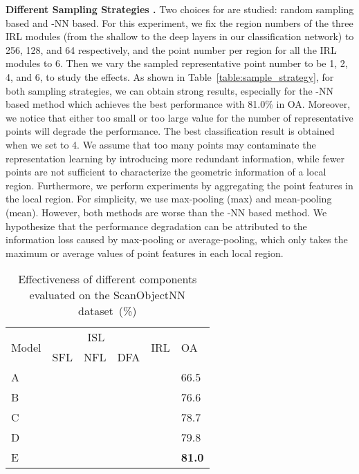 \documentclass[journal]{IEEEtran}
\begin{document}
\noindent\textbf{Different Sampling Strategies .} Two choices for  are studied: random sampling based and -NN based. For this experiment, we fix the region numbers of the three IRL modules (from the shallow to the deep layers in our classification network) to 256, 128, and 64 respectively, and the point number  per region for all the IRL modules to 6. Then we vary the sampled representative point number  to be 1, 2, 4, and 6, to study the effects.
As shown in Table~\ref{table:sample_strategy}, for both sampling strategies, we can obtain strong results, especially for the -NN based method which achieves the best performance with 81.0\% in OA. Moreover, we notice that either too small or too large value for the number of representative points  will degrade the performance. The best classification result is obtained when we set  to 4. We assume that too many points may contaminate the representation learning by introducing more redundant information, while fewer points are not sufficient to characterize the geometric information of a local region. 
Furthermore, we perform experiments by aggregating the point features in the local region. For simplicity, we use max-pooling (max) and mean-pooling (mean). 
However, both methods are worse than the -NN based method. We hypothesize that the performance degradation can be attributed to the information loss caused by max-pooling or average-pooling, which only takes the maximum or average values of point features in each local region. 


\begin{table}[tb]
\small
\centering
\caption{Effectiveness of different components evaluated on the ScanObjectNN dataset~(\%)}
\begin{tabular}{|*{1}{p{1.0cm}<{\centering}}|*{3}{p{1.0cm}<{\centering}}|*{1}{p{1.0cm}<{\centering}}|*{1}{p{1.0cm}<{\centering}}|}
\hline
\multirow{2}{*}{Model}& \multicolumn{3}{c|}{ISL} & \multicolumn{1}{c|}{\multirow{2}{*}{IRL}} & \multirow{2}{*}{OA}\\
\cline{2-4}  & SFL & NFL & DFA & \multicolumn{1}{c|}{} & \multicolumn{1}{c|}{} \\
\hline
\hline
A &  &  & &  & 66.5 \\
B &  &  &  &  & 76.6\\
C &  &  &  &  & 78.7\\
D &  &  &  &  & 79.8\\
E &  &  &  &  & \textbf{81.0} \\
\hline
\end{tabular}
\label{table:effectiveness_of_components}
\end{table}
\end{document}
